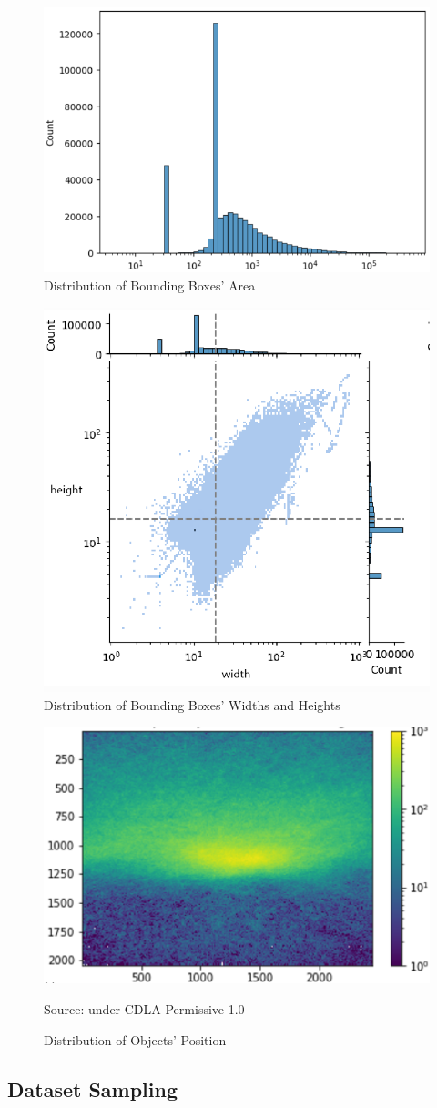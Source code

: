   \begin{figure}[p]
    \centering
    \includegraphics[width=.5\textwidth]{figures/area-dist.png}
    \caption{Distribution of Bounding Boxes' Area}
    \label{fig:areadist}
  \end{figure}
  \begin{figure}[p]
    \centering
    \includegraphics[width=.5\textwidth]{figures/hw-dist2.png}
    \caption{Distribution of Bounding Boxes' Widths and Heights}
    \label{fig:hwdist}
  \end{figure}
  \begin{figure}[p]
    \centering
    \includegraphics[width=.5\textwidth]{figures/object-pos-dist.png}
    \caption*{Source: \textcite{aot_dataset} under CDLA-Permissive 1.0}
    \caption{Distribution of Objects' Position}
    \label{fig:objectheatmap}
  \end{figure}




  \subsection{Dataset Sampling}
  \label{section:datasetsampling}
